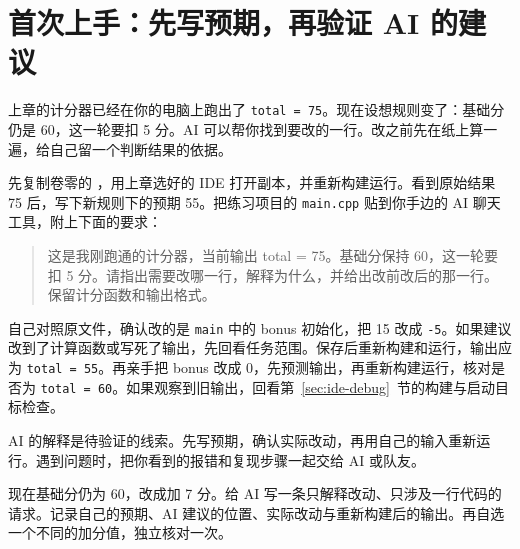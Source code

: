 \section{首次上手：先写预期，再验证 AI 的建议}
\label{sec:ai-first-practice}

上章的计分器已经在你的电脑上跑出了 \texttt{total = 75}。现在设想规则变了：基础分仍是 60，这一轮要扣 5 分。AI 可以帮你找到要改的一行。改之前先在纸上算一遍，给自己留一个判断结果的依据。

\begin{example}[请 AI 建议一处小改动]
先复制卷零的 ，用上章选好的 IDE 打开副本，并重新构建运行。看到原始结果 75 后，写下新规则下的预期 55。把练习项目的 \texttt{main.cpp} 贴到你手边的 AI 聊天工具，附上下面的要求：

\begin{quote}
这是我刚跑通的计分器，当前输出 total = 75。基础分保持 60，这一轮要扣 5 分。请指出需要改哪一行，解释为什么，并给出改前改后的那一行。保留计分函数和输出格式。
\end{quote}

自己对照原文件，确认改的是 \texttt{main} 中的 bonus 初始化，把 15 改成 \texttt{-5}。如果建议改到了计算函数或写死了输出，先回看任务范围。保存后重新构建和运行，输出应为 \texttt{total = 55}。再亲手把 bonus 改成 0，先预测输出，再重新构建运行，核对是否为 \texttt{total = 60}。如果观察到旧输出，回看第~\ref{sec:ide-debug}~节的构建与启动目标检查。
\end{example}

\begin{conclusion}
AI 的解释是待验证的线索。先写预期，确认实际改动，再用自己的输入重新运行。遇到问题时，把你看到的报错和复现步骤一起交给 AI 或队友。
\end{conclusion}

\begin{exercise}\label{ex:ai-first-practice}
现在基础分仍为 60，改成加 7 分。给 AI 写一条只解释改动、只涉及一行代码的请求。记录自己的预期、AI 建议的位置、实际改动与重新构建后的输出。再自选一个不同的加分值，独立核对一次。
\end{exercise}
